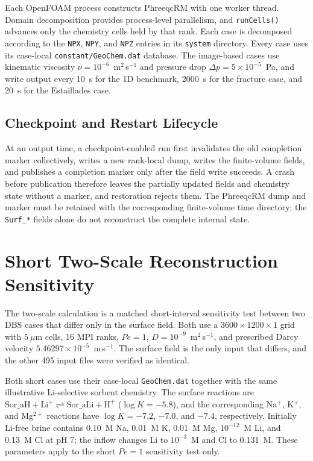 Each OpenFOAM process constructs PhreeqcRM with one worker thread. Domain
decomposition provides process-level parallelism, and \texttt{runCells()}
advances only the chemistry cells held by that rank. Each case is decomposed
according to the \texttt{NPX}, \texttt{NPY}, and \texttt{NPZ} entries in its
\texttt{system} directory. Every case uses its case-local
\texttt{constant/GeoChem.dat} database. The image-based cases use kinematic
viscosity $\nu = 10^{-6}$~m$^2$\,s$^{-1}$ and pressure drop
$\Delta p = 5\times10^{-5}$~Pa, and write output every 10~s for the 1D
benchmark, 2000~s for the fracture case, and 20~s for the Estaillades case.

\subsection{Checkpoint and Restart Lifecycle}

At an output time, a checkpoint-enabled run first invalidates the old
completion marker collectively, writes a new rank-local dump, writes the
finite-volume fields, and publishes a completion marker only after the field
write succeeds. A crash before publication therefore leaves the partially
updated fields and chemistry state without a marker, and restoration rejects
them. The PhreeqcRM dump and marker must be retained with the corresponding
finite-volume time directory; the \texttt{Surf\_*} fields alone do not
reconstruct the complete internal state.

\section{Short Two-Scale Reconstruction Sensitivity}

The two-scale calculation is a matched short-interval sensitivity test between
two DBS cases that differ only in the surface field. Both use a
$3600\times1200\times1$ grid with $5~\mu$m cells,
16 MPI ranks, $Pe=1$, $D=10^{-9}$~m$^2$\,s$^{-1}$, and prescribed Darcy velocity
$5.46297\times10^{-5}$~m\,s$^{-1}$. The surface field is the only input that
differs, and the other 495 input files were verified as identical.

Both short cases use their case-local \texttt{GeoChem.dat} together with the
same illustrative Li-selective sorbent chemistry. The surface reactions are
$\mathrm{Sor\_aH}+\mathrm{Li^+}\rightleftharpoons\mathrm{Sor\_aLi}+\mathrm{H^+}$
($\log K=-5.8$), and the corresponding Na$^+$, K$^+$, and Mg$^{2+}$ reactions
have $\log K=-7.2$, $-7.0$, and $-7.4$, respectively. Initially Li-free brine
contains 0.10~M Na, 0.01~M K, 0.01~M Mg, $10^{-12}$~M Li, and 0.13~M Cl at pH
7; the inflow changes Li to $10^{-3}$~M and Cl to 0.131~M. These parameters
apply to the short $Pe=1$ sensitivity test only.


